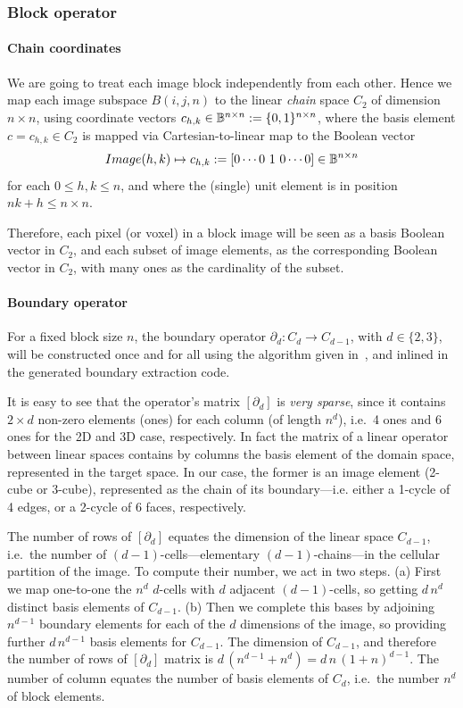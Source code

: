 \subsubsection{Block operator }\label{sec:bbbb}

\paragraph{Chain coordinates }\label{sec:bbbb} 
We are going to treat each image block independently from each other. Hence we map each image subspace $B(i,j,n)$ to the linear \emph{chain} space $C_2$ of dimension $n\times n$, using coordinate vectors $c_{h,k}\in \mathbb{B}^{n\times n} := \{0,1\}^{n\times n}$, where the basis element $c = c_{h,k} \in C_2$ is mapped via Cartesian-to-linear map to the Boolean vector 
\[
Image(h,k) \mapsto c_{h,k} := [0 \cdots 0\ 1\ 0 \cdots 0] \in \mathbb{B}^{n\times n}
\]
for each $0\leq h,k \leq n$, and where the (single) unit element is in position $nk + h \leq n\times n$.

Therefore, each pixel (or voxel) in a block image will be seen as a basis Boolean vector in $C_2$, and each subset of image elements, as the corresponding Boolean vector in $C_2$, with many ones as the cardinality of the subset.

\paragraph{Boundary operator }\label{sec:bbbb} For a fixed block size $n$, the boundary operator $\partial_d : C_d\to C_{d-1}$, with $d\in\{2,3\}$, will be constructed once and for all using the algorithm given in~\cite{}, and inlined in the generated boundary extraction code.

It is easy to see that the operator's matrix $[\partial_d]$ is \emph{very sparse}, since it contains $2\times d$ non-zero elements (ones) for each column (of length $n^d$), i.e.~4 ones and 6 ones for the 2D and 3D case, respectively. In fact the matrix of a linear operator between linear spaces contains by columns the basis element of the domain space, represented in the target space. In our case, the former is an image element (2-cube or 3-cube), represented as the chain of its boundary---i.e. either a 1-cycle of 4 edges, or  a 2-cycle of 6 faces, respectively.  

The number of rows of $[\partial_d]$ equates the dimension of the linear space $C_{d-1}$, i.e.~the number of $(d-1)$-cells---elementary $(d-1)$-chains---in the cellular partition of the image. To compute their number, we act in two steps. (a) First we map one-to-one the $n^d$ $d$-cells with $d$ adjacent $(d-1)$-cells, so getting $d\,n^d$ distinct basis elements of $C_{d-1}$. (b) Then we complete this bases by adjoining $n^{d-1}$ boundary elements for each of the $d$ dimensions of the image, so providing further $d\,n^{d-1}$ basis elements for $C_{d-1}$. The dimension of $C_{d-1}$, and therefore the number of rows of $[\partial_d]$ matrix is $d\,(n^{d-1}+n^{d}) = d\,n\,(1+n)^{d-1}$. The number of column equates the number of basis elements of $C_d$, i.e.~the number $n^d$ of block elements.

